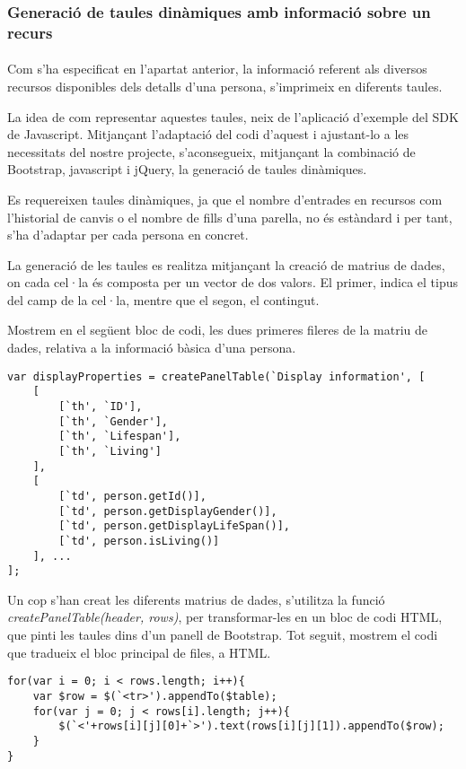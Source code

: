 \subsubsection{Generació de taules dinàmiques amb informació sobre un recurs}

\paragraph{}
Com s'ha especificat en l'apartat anterior, la informació referent als diversos recursos disponibles dels detalls d'una persona, s'imprimeix en diferents taules.

La idea de com representar aquestes taules, neix de l'aplicació d'exemple del SDK de Javascript. Mitjançant l'adaptació del codi d'aquest i ajustant-lo a les necessitats del nostre projecte, s'aconsegueix, mitjançant la combinació de Bootstrap, javascript i jQuery, la generació de taules dinàmiques.

Es requereixen taules dinàmiques, ja que el nombre d'entrades en recursos com l'historial de canvis o el nombre de fills d'una parella, no és estàndard i per tant, s'ha d'adaptar per cada persona en concret.

La generació de les taules es realitza mitjançant la creació de matrius de dades, on cada cel·la és composta per un vector de dos valors. El primer, indica el tipus del camp de la cel·la, mentre que el segon, el contingut.

Mostrem en el següent bloc de codi, les dues primeres fileres de la matriu de dades, relativa a la informació bàsica d'una persona.

\begin{lstlisting}[style=rawOwn,caption={Exemple de les dues primeres files d'una matriu de dades}]
var displayProperties = createPanelTable(`Display information', [
    [
        [`th', `ID'],
        [`th', `Gender'],
        [`th', `Lifespan'],
        [`th', `Living']
    ],
    [
        [`td', person.getId()],
        [`td', person.getDisplayGender()],
        [`td', person.getDisplayLifeSpan()],
        [`td', person.isLiving()]
    ], ...
];
\end{lstlisting}

Un cop s'han creat les diferents matrius de dades, s'utilitza la funció \emph{create\-Panel\-Table(header, rows)}, per transformar-les en un bloc de codi HTML, que pinti les taules dins d'un panell de Bootstrap. Tot seguit, mostrem el codi que tradueix el bloc principal de files, a HTML.

\begin{lstlisting}[style=rawOwn,caption={Transformació de files d'una matriu en HTML}]
for(var i = 0; i < rows.length; i++){
    var $row = $(`<tr>').appendTo($table);
    for(var j = 0; j < rows[i].length; j++){
        $(`<'+rows[i][j][0]+`>').text(rows[i][j][1]).appendTo($row);
    }
}
\end{lstlisting}
